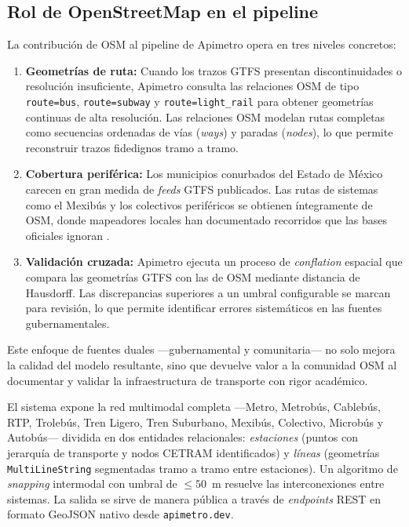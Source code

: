 \subsection{Rol de OpenStreetMap en el pipeline}

La contribución de OSM al pipeline de Apimetro opera en tres niveles concretos:

\begin{enumerate}[nosep, leftmargin=1.5em]
  \item \textbf{Geometrías de ruta:}  Cuando los trazos GTFS presentan
    discontinuidades o resolución insuficiente, Apimetro consulta las relaciones
    OSM de tipo \texttt{route=bus}, \texttt{route=subway} y
    \texttt{route=light\_rail} para obtener geometrías continuas de alta
    resolución.  Las relaciones OSM modelan rutas completas como secuencias
    ordenadas de vías (\textit{ways}) y paradas (\textit{nodes}), lo que permite
    reconstruir trazos fidedignos tramo a tramo.
  \item \textbf{Cobertura periférica:}  Los municipios conurbados del Estado de
    México carecen en gran medida de \textit{feeds} GTFS publicados.  Las rutas
    de sistemas como el Mexibús y los colectivos periféricos se obtienen
    íntegramente de OSM, donde mapeadores locales han documentado recorridos que
    las bases oficiales ignoran \citep{haklay2010good}.
  \item \textbf{Validación cruzada:}  Apimetro ejecuta un proceso de
    \textit{conflation} espacial que compara las geometrías GTFS con las de OSM
    mediante distancia de Hausdorff.  Las discrepancias superiores a un umbral
    configurable se marcan para revisión, lo que permite identificar errores
    sistemáticos en las fuentes gubernamentales.
\end{enumerate}

Este enfoque de fuentes duales ---gubernamental y comunitaria--- no solo mejora la
calidad del modelo resultante, sino que devuelve valor a la comunidad OSM al
documentar y validar la infraestructura de transporte con rigor académico.

El sistema expone la red multimodal completa ---Metro, Metrobús, Cablebús, RTP,
Trolebús, Tren Ligero, Tren Suburbano, Mexibús, Colectivo, Microbús y Autobús---
dividida en dos entidades relacionales: \textit{estaciones} (puntos con jerarquía
de transporte y nodos CETRAM identificados) y \textit{líneas} (geometrías
\texttt{MultiLineString} segmentadas tramo a tramo entre estaciones).  Un algoritmo
de \textit{snapping} intermodal con umbral de $\leq 50$~m resuelve las
interconexiones entre sistemas.  La salida se sirve de manera pública a través de
\textit{endpoints} REST en formato GeoJSON nativo desde \texttt{apimetro.dev}.

